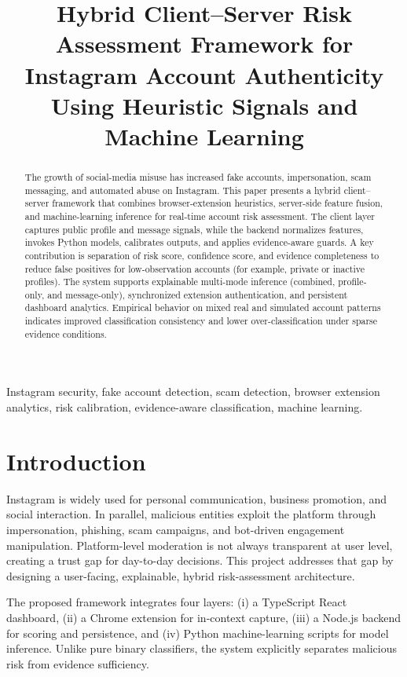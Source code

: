 ﻿\documentclass[conference]{IEEEtran}
\title{Hybrid Client--Server Risk Assessment Framework for Instagram Account Authenticity Using Heuristic Signals and Machine Learning}
\author{%
\IEEEauthorblockN{M. Sri Tanay, G. Teja Uday Kiran, R. Nithin Reddy, S. D. Soman}
\IEEEauthorblockA{Department of Information Technology\\
J.B. Institute of Engineering \& Technology\\
Hyderabad, India}
}
\begin{document}
\maketitle

\begin{abstract}
The growth of social-media misuse has increased fake accounts, impersonation, scam messaging, and automated abuse on Instagram. This paper presents a hybrid client--server framework that combines browser-extension heuristics, server-side feature fusion, and machine-learning inference for real-time account risk assessment. The client layer captures public profile and message signals, while the backend normalizes features, invokes Python models, calibrates outputs, and applies evidence-aware guards. A key contribution is separation of risk score, confidence score, and evidence completeness to reduce false positives for low-observation accounts (for example, private or inactive profiles). The system supports explainable multi-mode inference (combined, profile-only, and message-only), synchronized extension authentication, and persistent dashboard analytics. Empirical behavior on mixed real and simulated account patterns indicates improved classification consistency and lower over-classification under sparse evidence conditions.
\end{abstract}

\begin{IEEEkeywords}
Instagram security, fake account detection, scam detection, browser extension analytics, risk calibration, evidence-aware classification, machine learning.
\end{IEEEkeywords}

\section{Introduction}
Instagram is widely used for personal communication, business promotion, and social interaction. In parallel, malicious entities exploit the platform through impersonation, phishing, scam campaigns, and bot-driven engagement manipulation. Platform-level moderation is not always transparent at user level, creating a trust gap for day-to-day decisions. This project addresses that gap by designing a user-facing, explainable, hybrid risk-assessment architecture.

The proposed framework integrates four layers: (i) a TypeScript React dashboard, (ii) a Chrome extension for in-context capture, (iii) a Node.js backend for scoring and persistence, and (iv) Python machine-learning scripts for model inference. Unlike pure binary classifiers, the system explicitly separates malicious risk from evidence sufficiency.
\end{document}
